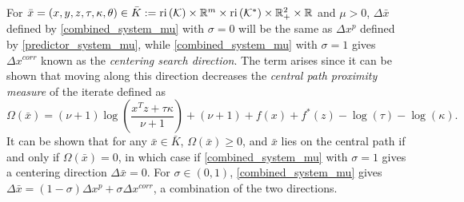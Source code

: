 \documentclass[10pt]{article}
\theoremstyle{definition}
\theoremstyle{plain}
\def\relint{\protect{\textnormal{ri}}}
\begin{document}
For $\bar x = (x,y,z,\tau,\kappa, \theta) \in \bar K := \relint\left(\mathcal{K}\right) \times \mathbb{R}^m \times \relint\left(\mathcal{K}^*\right)\times \mathbb{R}_+^2 \times \mathbb{R}$ and $\mu > 0$, $\Delta \bar x$ defined by  \eqref{combined_system_mu} with $\sigma = 0$ will be the same as $\Delta x^p$ defined by \eqref{predictor_system_mu}, while \eqref{combined_system_mu} with $\sigma = 1$ gives $\Delta x^{corr}$ known as the \textit{centering search direction}. The term arises since it can be shown that moving along this direction decreases the \textit{central path proximity measure} of the iterate defined as 
\[\Omega(\bar x) = (\nu+1) \log\left(\frac{x^T z + \tau\kappa}{\nu+1}\right) + (\nu+1)+ f(x)+f^*(z) - \log(\tau) - \log(\kappa).\] 
It can be shown that for any $\bar x \in \bar K$, $\Omega (\bar x) \geq 0$, and $\bar x $ lies on the central path if and only if $\Omega(\bar x)=0$, in which case if \eqref{combined_system_mu} with $\sigma = 1$ gives a centering direction $\Delta \bar x = 0$. For $\sigma \in \left(0,1\right)$, \eqref{combined_system_mu} gives $\Delta \bar x = (1-\sigma) \Delta x^p + \sigma \Delta x^{corr}$, a combination of the two directions. \\
\end{document}

